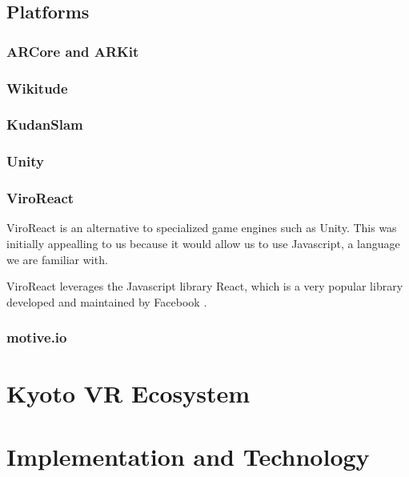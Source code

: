 \documentclass[a4paper, 10pt, american]{article}
\begin{document}
\lipsum[4-5]

\subsection{Platforms}
\label{sec:platforms}

\subsubsection{ARCore and ARKit}
\label{sec:ARCoreAndARKit}

\subsubsection{Wikitude}
\label{sec:wikitude}

\subsubsection{KudanSlam}
\label{sec:kudanSlam}

\subsubsection{Unity}
\label{sec:unity}

\subsubsection{ViroReact}
\label{sec:viroReact}

ViroReact is an alternative to specialized game engines such as Unity. This
was initially appealling to us because it would allow us to use Javascript, a
language we are familiar with.

ViroReact leverages the Javascript library React, which is a very popular
library developed and maintained by Facebook \autocite{facebook2019}.

\subsubsection{motive.io}
\label{sec:motive.io}

\section{Kyoto VR Ecosystem}
\label{sec:KyotoVREcosystem}

\lipsum

\section{Implementation and Technology}
\label{sec:implementationAndTechnology}
\end{document}
